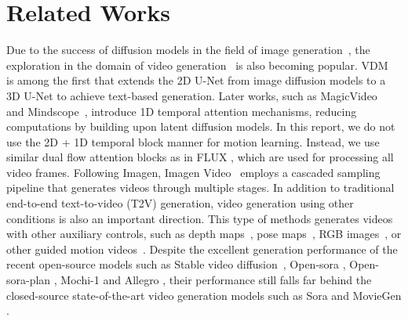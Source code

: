 \documentclass{article}
\begin{document}







\section{Related Works}
\label{sec:related_works}

Due to the success of diffusion models in the field of image generation~\citep{rombach2022high, ho2020denoising}, the exploration in the domain of video generation~\citep{guo2023animatediff,jiang2023text2performer,singer2022make,wang2023lavie,yang2023probabilistic,zhang2023show,ma2024follow,chen2024follow,xue2024follow,ma2024follow2} is also becoming popular. VDM~\citep{ho2022video} is among the first that extends the 2D U-Net from image diffusion models to a 3D U-Net to achieve text-based generation.
%
Later works, such as MagicVideo~\citep{zhou2023magicvideo} and Mindscope~\citep{wang2023modelscope}, introduce 1D temporal attention mechanisms, reducing computations by building upon latent diffusion models. In this report, we do not use the 2D + 1D temporal block manner for motion learning. Instead, we use similar dual flow attention blocks as in FLUX \cite{FLUX}, which are used for processing all video frames.
%
Following Imagen, Imagen Video~\citep{ho2022imagen} employs a cascaded sampling pipeline that generates videos through multiple stages.
%
In addition to traditional end-to-end text-to-video (T2V) generation, 
video generation using other conditions is also an important direction.
%
This type of methods generates videos with other auxiliary controls, such as depth maps~\citep{guo2023sparsectrl,he2023animate}, pose maps~\citep{xu2023magicanimate,hu2023animate,wang2023disco,ma2023follow}, RGB images~\citep{blattmann2023stable,chen2023seine,ni2023conditional}, or other guided motion videos~\citep{zhao2023motiondirector,wu2023lamp}.  
%
Despite the excellent generation performance of the recent open-source models such as Stable video diffusion~\citep{blattmann2023stable}, Open-sora \cite{opensora}, Open-sora-plan \cite{pku_yuan_lab_and_tuzhan_ai_etc_2024_10948109}, Mochi-1 \cite{genmo2024mochi} and Allegro \cite{zhou2024allegro}, their performance still falls far behind the closed-source
%
state-of-the-art video generation models such as Sora \cite{videoworldsimulators2024} and MovieGen \cite{polyak2024movie}. 




\clearpage
{%


}
\end{document}
